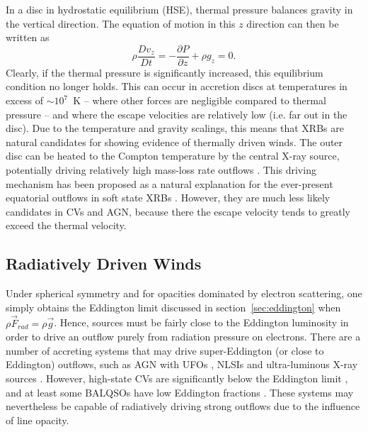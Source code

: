 In a disc in hydrostatic equilibrium (HSE), 
thermal pressure balances gravity in the vertical direction. 
The equation of motion in this $z$ direction can then be written as 
\begin{equation}
\label{eq:hse}
\rho \frac{Dv_z}{Dt} = -\frac{\partial P}{\partial z} +  \rho g_z = 0.
\end{equation}
Clearly, if the thermal pressure is significantly 
increased, this equilibrium condition no longer holds. 
This can occur in accretion discs at temperatures in excess of $\sim10^7$~K --
where other forces are negligible compared to thermal pressure -- 
and where the escape velocities are relatively low (i.e. far out in the disc).
Due to the temperature and gravity scalings, this means
that XRBs are natural candidates for showing evidence of thermally driven
winds. The outer disc can be heated to the Compton temperature by 
the central X-ray source,
potentially driving relatively high mass-loss rate outflows 
\citep{begelman1983,woods1996}. 
This driving mechanism has been proposed as a natural explanation
for the ever-present equatorial outflows in soft state XRBs \citep{ponti2012}.
However, they are much less likely candidates in CVs and AGN, because there
the escape velocity tends to greatly exceed the thermal velocity.

\subsection{Radiatively Driven Winds}
\label{sec:rad_winds}

Under spherical symmetry and for opacities dominated by electron scattering, 
one simply obtains the Eddington limit discussed
in section~\ref{sec:eddington} when $\rho \vec{F}_{rad} = \rho \vec{g}$. 
Hence, sources must be fairly close to the Eddington luminosity in order 
to drive an outflow purely from radiation 
pressure on electrons. There are a number of accreting systems that may drive
super-Eddington (or close to Eddington) outflows, 
such as AGN with UFOs \citep[e.g.][]{reeves2002,pounds2016},
NLSIs \citep{done2015} and ultra-luminous X-ray sources \citep[ULXs;][]{walton2013}.
However, high-state CVs are significantly below the Eddington limit 
\citep{warnerbook}, and at least some BALQSOs have low Eddington fractions 
\citep[$\sim25\%$ have $L/L_{\mathrm{Edd}}<0.1$;][]{grupenousek2015}.
These systems may nevertheless be capable of radiatively driving strong 
outflows due to the influence of line opacity.

